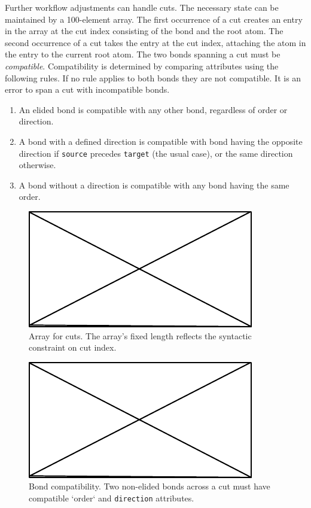 \documentclass{article}
\def\ttt{\texttt}
\begin{document}
Further workflow adjustments can handle cuts. The necessary state can be maintained by a 100-element array. The first occurrence of a cut creates an entry in the array at the cut index consisting of the bond and the root atom. The second occurrence of a cut takes the entry at the cut index, attaching the atom in the entry to the current root atom. The two bonds spanning a cut must be \textit{compatible}. Compatibility is determined by comparing attributes using the following rules. If no rule applies to both bonds they are not compatible. It is an error to span a cut with incompatible bonds.

\begin{enumerate}
    \item An elided bond is compatible with any other bond, regardless of order or direction.
    \item A bond with a defined direction is compatible with bond having the opposite direction if \ttt{source} precedes \ttt{target} (the usual case), or the same direction otherwise.
    \item A bond without a direction is compatible with any bond having the same order.
\end{enumerate}

\begin{figure}
    \centering
    \includegraphics{filler}
    \caption{Array for cuts. The array's fixed length reflects the syntactic constraint on cut index.}
    \label{fig:cuts-array}
\end{figure}

\begin{figure}
    \centering
    \includegraphics{filler}
    \caption{Bond compatibility. Two non-elided bonds across a cut must have compatible `order` and \ttt{direction} attributes.}
    \label{fig:bond-compatibility}
\end{figure}
\end{document}
